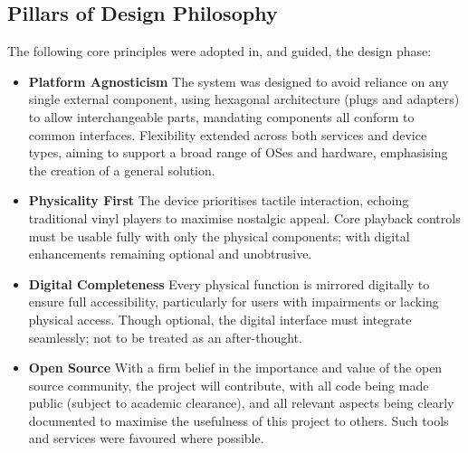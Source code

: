         \subsection{Pillars of Design Philosophy}
    
            The following core principles were adopted in, and guided, the design phase:
    
            \begin{itemize}
                \item \textbf{Platform Agnosticism} The system was designed to avoid reliance on any single external component, using hexagonal architecture (plugs and adapters) to allow interchangeable parts, mandating components all conform to common interfaces. Flexibility extended across both services and device types, aiming to support a broad range of OSes and hardware, emphasising the creation of a general solution.
            \end{itemize}
    
            \begin{itemize}
                \item \textbf{Physicality First} The device prioritises tactile interaction, echoing traditional vinyl players to maximise nostalgic appeal. Core playback controls must be usable fully with only the physical components; with digital enhancements remaining optional and unobtrusive.
            \end{itemize}
    
            \begin{itemize}
                \item \textbf{Digital Completeness} Every physical function is mirrored digitally to ensure full accessibility, particularly for users with impairments or lacking physical access. Though optional, the digital interface must integrate seamlessly; not to be treated as an after-thought.
            \end{itemize}
    
            \begin{itemize}
                \item \textbf{Open Source} With a firm belief in the importance and value of the open source community, the project will contribute, with all code being made public (subject to academic clearance), and all relevant aspects being clearly documented to maximise the usefulness of this project to others. Such tools and services were favoured where possible.
            \end{itemize}
    
